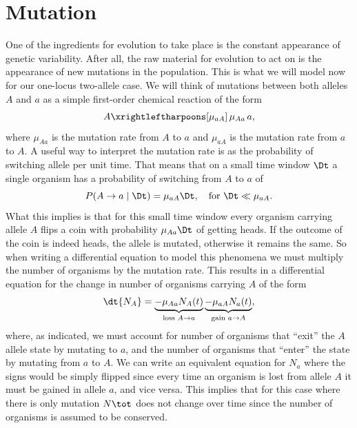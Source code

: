 \section{Mutation}

One of the ingredients for evolution to take place is the constant appearance
of genetic variability. After all, the raw material for evolution to act on is
the appearance of new mutations in the population. This is what we will model
now for our one-locus two-allele case. We will think of mutations between both
alleles $A$ and $a$ as a simple first-order chemical reaction of the form
\begin{equation}
  A \xrightleftharpoons[\mu_{a A}]
  {\,\mu_{A a}\,} a,
\end{equation}
where $\mu_{A a}$ is the mutation rate from $A$ to $a$ and 
$\mu_{a A}$ is the mutation rate from $a$ to $A$. A useful way to
interpret the mutation rate is as the probability of switching allele per unit
time. That means that on a small time window $\Dt$ a single organism has a
probability of switching from $A$ to $a$ of
\begin{equation}
  P(A \rightarrow a \mid \Dt) = \mu_{a A} \Dt, \quad 
  \text{for } \Dt \ll \mu_{aA}.
\end{equation}
What this implies is that for this small time window every organism carrying
allele $A$ flips a coin with probability $\mu_{A a} \Dt$ of getting
heads. If the outcome of the coin is indeed heads, the allele is mutated,
otherwise it remains the same. So when writing a differential equation to model
this phenomena we must multiply the number of organisms by the mutation rate.
This results in a differential equation for the change in number of organisms
carrying $A$ of the form
\begin{equation}
  \dt{N_A} = 
  \underbrace{- \mu_{A a} N_A(t)}_{\text{loss } A \rightarrow a}
  \underbrace{- \mu_{a A} N_a(t)}_{\text{gain } a \rightarrow A},
\end{equation}
where, as indicated, we must account for number of organisms that ``exit'' the
$A$ allele state by mutating to $a$, and the number of organisms that ``enter''
the state by mutating from $a$ to $A$. We can write an equivalent equation for
$N_a$ where the signs would be simply flipped since every time an organism is
lost from allele $A$ it must be gained in allele $a$, and vice versa. This
implies that for this case where there is only mutation $N\tot$ does not change
over time since the number of organisms is assumed to be conserved.

